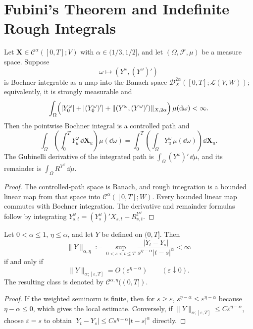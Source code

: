 \section{Fubini's Theorem and Indefinite Rough Integrals}

\begin{thm}
Let $\mathbf X\in\mathscr C^\alpha([0,T];V)$ with
$\alpha\in(1/3,1/2]$, and let $(\Omega,\mathcal F,\mu)$ be a measure space.
Suppose
\[
  \omega\longmapsto (Y^\omega,(Y^\omega)')
\]
is Bochner integrable as a map into the Banach space
$\mathscr D_X^{2\alpha}([0,T];\mathcal L(V,W))$; equivalently, it is strongly
measurable and
\[
 \int_\Omega\Bigl(
 |Y_0^\omega|+|(Y_0^\omega)'|
 +\|(Y^\omega,(Y^\omega)')\|_{X,2\alpha}
 \Bigr)\,\mu(\mathrm{d}\omega)<\infty.
\]
Then the pointwise Bochner integral is a controlled path and
\[
 \int_\Omega\left(\int_0^T Y_u^\omega\,\dd\mathbf X_u\right)\mu(\dd\omega)
 =\int_0^T\left(\int_\Omega Y_u^\omega\,\mu(\dd\omega)\right)\dd\mathbf X_u.
\]
The Gubinelli derivative of the integrated path is
$\int_\Omega(Y^\omega)'\,\dd\mu$, and its remainder is
$\int_\Omega R^{Y^\omega}\,\dd\mu$.
\end{thm}

\begin{proof}
The controlled-path space is Banach, and rough integration is a bounded linear
map from that space into $\mathcal C^\alpha([0,T];W)$.  Every bounded linear
map commutes with Bochner integration.  The derivative and remainder formulas
follow by integrating
$Y^\omega_{s,t}=(Y_s^\omega)'X_{s,t}+R^{Y^\omega}_{s,t}$.
\end{proof}

\begin{prop}
Let $0<\alpha\le1$, $\eta\le\alpha$, and let $Y$ be defined on $(0,T]$.  Then
\[
 \|Y\|_{\alpha,\eta}
 :=\sup_{0<s<t\le T}
   \frac{|Y_t-Y_s|}{s^{\eta-\alpha}|t-s|^\alpha}<\infty
\]
if and only if
\[
  \|Y\|_{\alpha;[\varepsilon,T]}
  =O(\varepsilon^{\eta-\alpha})
  \qquad(\varepsilon\downarrow0).
\]
The resulting class is denoted by $\mathcal C^{\alpha,\eta}((0,T])$.
\end{prop}

\begin{proof}
If the weighted seminorm is finite, then for $s\ge\varepsilon$,
$s^{\eta-\alpha}\le\varepsilon^{\eta-\alpha}$ because
$\eta-\alpha\le0$, which gives the local estimate.  Conversely, if
$\|Y\|_{\alpha;[\varepsilon,T]}\le C\varepsilon^{\eta-\alpha}$, choose
$\varepsilon=s$ to obtain
$|Y_t-Y_s|\le Cs^{\eta-\alpha}|t-s|^\alpha$ directly.
\end{proof}

